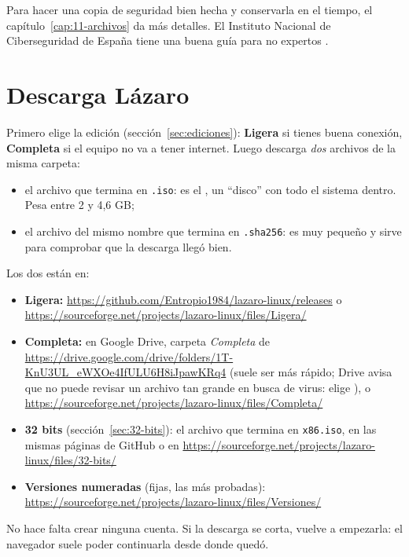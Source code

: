 Para hacer una copia de seguridad bien hecha y conservarla en el tiempo,
el capítulo~\ref{cap:11-archivos} da más detalles. El Instituto Nacional de
Ciberseguridad de España tiene una buena guía para no expertos
\cite{incibe-copias}.

\section{Descarga Lázaro}\label{sec:descargar}

Primero elige la edición (sección~\ref{sec:ediciones}): \textbf{Ligera} si
tienes buena conexión, \textbf{Completa} si el equipo no va a tener
internet. Luego descarga \emph{dos} archivos de la misma carpeta:

\begin{itemize}
  \item el archivo que termina en \texttt{.iso}: es el , un
        \enquote{disco} con todo el sistema dentro. Pesa entre 2 y 4,6 GB;
  \item el archivo del mismo nombre que termina en \texttt{.sha256}: es muy
        pequeño y sirve para comprobar que la descarga llegó bien.
\end{itemize}

Los dos están en:
\begin{itemize}
  \item \textbf{Ligera:} \url{https://github.com/Entropio1984/lazaro-linux/releases}
        o \url{https://sourceforge.net/projects/lazaro-linux/files/Ligera/}
  \item \textbf{Completa:} en Google Drive, carpeta \emph{Completa} de
        \url{https://drive.google.com/drive/folders/1T-KnU3UL_eWXOe4IfULU6H8iJpawKRq4}
        (suele ser más rápido; Drive avisa que no puede revisar un archivo tan
        grande en busca de virus: elige ), o
        \url{https://sourceforge.net/projects/lazaro-linux/files/Completa/}
  \item \textbf{32 bits} (sección~\ref{sec:32-bits}): el archivo que termina en
        \texttt{x86.iso}, en las mismas páginas de GitHub o en
        \url{https://sourceforge.net/projects/lazaro-linux/files/32-bits/}
  \item \textbf{Versiones numeradas} (fijas, las más probadas):
        \url{https://sourceforge.net/projects/lazaro-linux/files/Versiones/}
\end{itemize}

No hace falta crear ninguna cuenta. Si la descarga se corta, vuelve a
empezarla: el navegador suele poder continuarla desde donde quedó.

